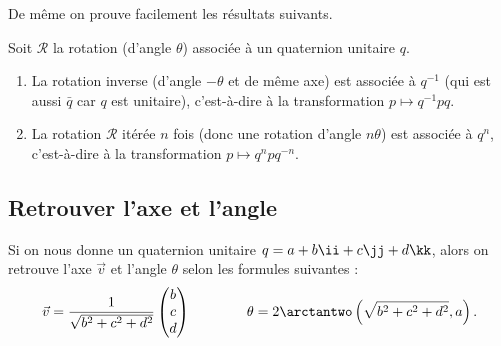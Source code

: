 \documentclass[11pt,class=report,crop=false]{standalone}
\begin{document}
De même on prouve facilement les résultats suivants.
\begin{proposition}
Soit  $\mathcal{R}$ la rotation (d'angle $\theta$) associée à un quaternion unitaire $q$.
\begin{enumerate}
  \item La rotation inverse (d'angle $-\theta$ et de même axe) est associée à $q^{-1}$ (qui est aussi $\bar q$ car $q$ est unitaire), c'est-à-dire à la transformation $p \mapsto q^{-1} p q$.
  \item La rotation $\mathcal{R}$ itérée $n$ fois (donc une rotation d'angle $n\theta$) est associée à $q^n$, c'est-à-dire à la transformation $p \mapsto q^n p q^{-n}$.
\end{enumerate}
\end{proposition}



\subsection{Retrouver l'axe et l'angle}

Si on nous donne un quaternion unitaire $q = a + b\ii +c\jj +d\kk$, alors on retrouve l'axe $\vec v$ et l'angle $\theta$ selon les formules suivantes :
$$\vec v = \frac{1}{\sqrt{b^2+c^2+d^2}} \begin{pmatrix}b\\c\\d\end{pmatrix}
\qquad\qquad
\theta = 2\arctantwo\left(\sqrt{b^2+c^2+d^2},a\right).$$
\end{document}
